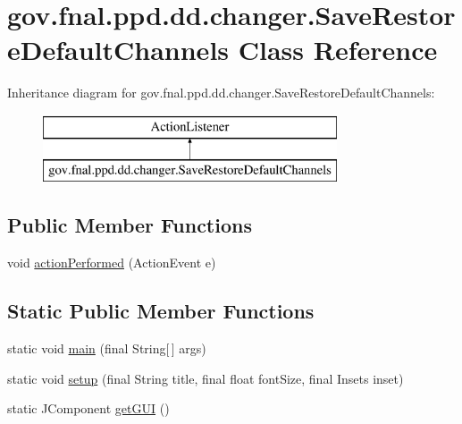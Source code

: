 \hypertarget{classgov_1_1fnal_1_1ppd_1_1dd_1_1changer_1_1SaveRestoreDefaultChannels}{\section{gov.\-fnal.\-ppd.\-dd.\-changer.\-Save\-Restore\-Default\-Channels Class Reference}
\label{classgov_1_1fnal_1_1ppd_1_1dd_1_1changer_1_1SaveRestoreDefaultChannels}
}
Inheritance diagram for gov.\-fnal.\-ppd.\-dd.\-changer.\-Save\-Restore\-Default\-Channels\-:\begin{figure}[H]
\begin{center}
\leavevmode
\includegraphics[height=2.000000cm]{classgov_1_1fnal_1_1ppd_1_1dd_1_1changer_1_1SaveRestoreDefaultChannels}
\end{center}
\end{figure}
\subsection*{Public Member Functions}
\begin{DoxyCompactItemize}
\item 
void \hyperlink{classgov_1_1fnal_1_1ppd_1_1dd_1_1changer_1_1SaveRestoreDefaultChannels_a8e4454a41c73b5fbe25212626574c507}{action\-Performed} (Action\-Event e)
\end{DoxyCompactItemize}
\subsection*{Static Public Member Functions}
\begin{DoxyCompactItemize}
\item 
static void \hyperlink{classgov_1_1fnal_1_1ppd_1_1dd_1_1changer_1_1SaveRestoreDefaultChannels_a49e137fa18de819556f440e577400af5}{main} (final String\mbox{[}$\,$\mbox{]} args)
\item 
static void \hyperlink{classgov_1_1fnal_1_1ppd_1_1dd_1_1changer_1_1SaveRestoreDefaultChannels_a42ec751770b045c82c3719d78980ccba}{setup} (final String title, final float font\-Size, final Insets inset)
\item 
static J\-Component \hyperlink{classgov_1_1fnal_1_1ppd_1_1dd_1_1changer_1_1SaveRestoreDefaultChannels_ac4d9cc40872b340a1a198a72dcdc3891}{get\-G\-U\-I} ()
\end{DoxyCompactItemize}
